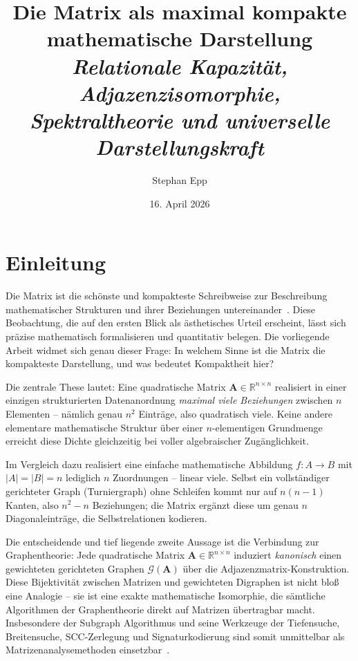 ﻿\documentclass[12pt, a4paper]{article}
\title{\textbf{Die Matrix als maximal kompakte\\ mathematische Darstellung}\\[0.5em]
  {\Large\itshape Relationale Kapazität, Adjazenzisomorphie,\\ Spektraltheorie und universelle
   Darstellungskraft}}
\author{Stephan Epp}
\date{16. April 2026}
\theoremstyle{definition}
\theoremstyle{remark}
\newcommand{\R}{\mathbb{R}}
\newcommand{\vA}{\bm{A}}
\begin{document}

\maketitle
\tableofcontents
\newpage

\section{Einleitung}
\label{sec:einleitung}

Die Matrix ist die schönste und kompakteste Schreibweise zur Beschreibung
mathematischer Strukturen und ihrer Beziehungen untereinander~\citep{horn2013}.
Diese Beobachtung, die auf den ersten Blick als ästhetisches Urteil erscheint,
lässt sich präzise mathematisch formalisieren und quantitativ belegen. Die
vorliegende Arbeit widmet sich genau dieser Frage: In welchem Sinne ist die
Matrix die kompakteste Darstellung, und was bedeutet Kompaktheit hier?

Die zentrale These lautet: Eine quadratische Matrix $\vA \in \R^{n \times n}$
realisiert in einer einzigen strukturierten Datenanordnung \emph{maximal viele
Beziehungen} zwischen $n$ Elementen -- nämlich genau $n^2$ Einträge, also
quadratisch viele. Keine andere elementare mathematische Struktur über einer
$n$-elementigen Grundmenge erreicht diese Dichte gleichzeitig bei voller
algebraischer Zugänglichkeit.

Im Vergleich dazu realisiert eine einfache mathematische Abbildung
$f: A \to B$ mit $|A| = |B| = n$ lediglich $n$ Zuordnungen -- linear viele.
Selbst ein vollständiger gerichteter Graph (Turniergraph) ohne Schleifen
kommt nur auf $n(n-1)$ Kanten, also $n^2 - n$ Beziehungen; die Matrix
ergänzt diese um genau $n$ Diagonaleinträge, die Selbstrelationen kodieren.

Die entscheidende und tief liegende zweite Aussage ist die Verbindung zur
Graphentheorie: Jede quadratische Matrix $\vA \in \R^{n \times n}$ induziert
\emph{kanonisch} einen gewichteten gerichteten Graphen $\mathcal{G}(\vA)$
über die Adjazenzmatrix-Konstruktion. Diese Bijektivität zwischen Matrizen
und gewichteten Digraphen ist nicht bloß eine Analogie -- sie ist eine exakte
mathematische Isomorphie, die sämtliche Algorithmen der Graphentheorie direkt
auf Matrizen übertragbar macht. Insbesondere der Subgraph Algorithmus
\citep{epp2026subgraph} und seine Werkzeuge der Tiefensuche, Breitensuche,
SCC-Zerlegung und Signaturkodierung sind somit unmittelbar als
Matrizenanalysemethoden einsetzbar~\citep{epp2026sysstate}.
\end{document}
